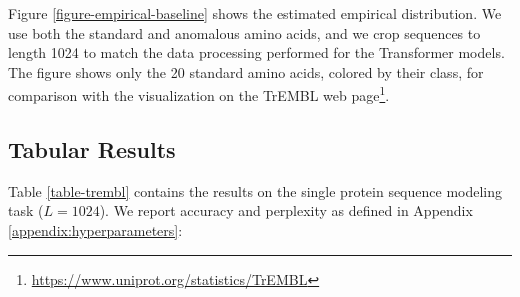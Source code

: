 Figure \ref{figure-empirical-baseline} shows the estimated empirical distribution. We use both the standard and anomalous amino acids, and we crop sequences to length 1024 to match the data processing performed for the Transformer models. The figure shows only the 20 standard amino acids, colored by their class, for comparison with the visualization on the TrEMBL web page\footnote{\url{https://www.uniprot.org/statistics/TrEMBL}}.

\subsection{Tabular Results}

Table \ref{table-trembl} contains the results on the single protein sequence modeling task ($L=1024$). We report accuracy and perplexity as defined in Appendix \ref{appendix:hyperparameters}:

\begin{comment}
We report the following evaluation metrics:
\begin{enumerate}
\item \textbf{Accuracy}: For unidirectional models, we measure the accuracy on next-token prediction, averaged across all sequence positions in the dataset. For bidirectional models, we mask each token with $15\%$ probability and measure accuracy across the masked positions.
\item \textbf{Perplexity}: For unidirectional models, we measure perplexity across all sequence positions in the dataset. For bidirectional models, similar to the accuracy case, we measure perplexity across the masked positions. \end{enumerate}
\end{comment}

